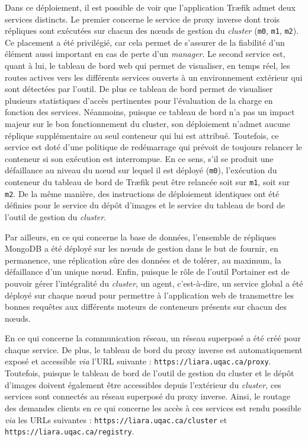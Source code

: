 Dans ce déploiement, il est possible de voir que l'application Tr\ae{}fik admet deux services distincts. Le premier concerne le service de proxy inverse dont trois répliques sont exécutées sur chacun des n\oe{}uds de gestion du \textit{cluster} (\texttt{m0}, \texttt{m1}, \texttt{m2}). Ce placement a été privilégié, car cela permet de s'assurer de la fiabilité d'un élément aussi important en cas de perte d'un \textit{manager}. Le second service est, quant à lui, le tableau de bord web qui permet de visualiser, en temps réel, les routes actives vers les différents services ouverts à un environnement extérieur qui sont détectées par l'outil. De plus ce tableau de bord permet de visualiser plusieurs statistiques d'accès pertinentes pour l'évaluation de la charge en fonction des services. Néanmoins, puisque ce tableau de bord n'a pas un impact majeur sur le bon fonctionnement du cluster, son déploiement n'admet aucune réplique supplémentaire au seul conteneur qui lui est attribué. Toutefois, ce service est doté d'une politique de redémarrage qui prévoit de toujours relancer le conteneur si son exécution est interrompue. En ce sens, s'il se produit une défaillance au niveau du n\oe{}ud sur lequel il est déployé (\texttt{m0}), l'exécution du conteneur du tableau de bord de Tr\ae{}fik peut être relancée soit sur \texttt{m1}, soit sur \texttt{m2}. De la même manière, des instructions de déploiement identiques ont été définies pour le service du dépôt d'images et le service du tableau de bord de l'outil de gestion du \textit{cluster}.

Par ailleurs, en ce qui concerne la base de données, l'ensemble de répliques MongoDB a été déployé sur les n\oe{}uds de gestion dans le but de fournir, en permanence, une réplication sûre des données et de tolérer, au maximum, la défaillance d'un unique n\oe{}ud. Enfin, puisque le rôle de l'outil Portainer est de pouvoir gérer l'intégralité du \textit{cluster}, un agent, c'est-à-dire, un service global a été déployé sur chaque n\oe{}ud pour permettre à l'application web de transmettre les bonnes requêtes aux différents moteurs de conteneurs présents sur chacun des n\oe{}uds.

En ce qui concerne la communication réseau, un réseau superposé a été créé pour chaque service. De plus, le tableau de bord du proxy inverse est automatiquement exposé et accessible \textit{via} l'\acs{URL} suivante : \texttt{https://liara.uqac.ca/proxy}. Toutefois, puisque le tableau de bord de l'outil de gestion du cluster et le dépôt d'images doivent également être accessibles depuis l'extérieur du \textit{cluster}, ces services sont connectés au réseau superposé du proxy inverse. Ainsi, le routage des demandes clients en ce qui concerne les accès à ces services est rendu possible \textit{via} les \acsp{URL} suivantes : \texttt{https://liara.uqac.ca/cluster} et \texttt{https://liara.uqac.ca/registry}.

